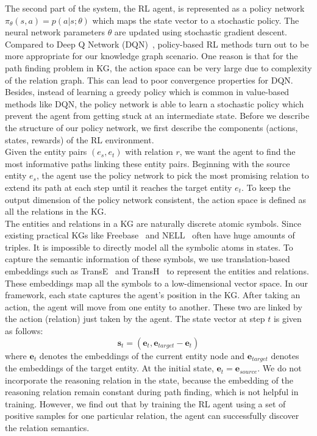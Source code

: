 \documentclass[11pt,letterpaper]{article}
\begin{document}
The second part of the system, the RL agent, is represented as a policy network $\pi_\theta(s,a)=p(a|s;\theta)$ which maps the state vector to a stochastic policy. The neural network parameters $\theta$ are updated using stochastic gradient descent. Compared to Deep Q Network (DQN)~\cite{Mnih}, policy-based RL methods turn out to be more appropriate for our knowledge graph scenario. One reason is that for the path finding problem in KG, the action space can be very large due to complexity of the relation graph. This can lead to poor convergence properties for DQN. Besides, instead of learning a greedy policy which is common in value-based methods like DQN, the policy network is able to learn a stochastic policy which prevent the agent from getting stuck at an intermediate state. Before we describe the structure of our policy network, we first describe the components (actions, states, rewards) of the RL environment.
\\

 Given the entity pairs $(e_s,e_t)$ with relation $r$, we want the agent to find the most informative paths linking these entity pairs. Beginning with the source entity $e_s$, the agent use the policy network to pick the most promising relation to extend its path at each step until it reaches the target entity $e_t$. To keep the output dimension of the policy network consistent, the action space is defined as all the relations in the KG.
\\

 The entities and relations in a KG are naturally discrete atomic symbols. Since existing practical KGs like Freebase~\cite{bollacker2008freebase} and NELL~\cite{carlson-aaai} often have huge amounts of triples. It is impossible to directly model all the symbolic atoms in states. To capture the semantic information of these symbols, we use translation-based embeddings such as TransE~\cite{bordes2013translating} and TransH~\cite{wang2014knowledge} to represent the entities and relations. These embeddings map all the symbols to a low-dimensional vector space. In our framework, each state captures the agent's position in the KG. After taking an action, the agent will move from one entity to another. These two are linked by the action (relation) just taken by the agent. The state vector at step $t$ is given as follows:
\begin{equation*}
\mathbf{s}_t = (\mathbf{e}_t, \mathbf{e}_{target} - \mathbf{e}_t)
\label{eq1}
\end{equation*}
where $\mathbf{e}_t$ denotes the embeddings of the current entity node and $\mathbf{e}_{target}$ denotes the embeddings of the target entity. At the initial state, $\mathbf{e}_t = \mathbf{e}_{source}$. We do not incorporate the reasoning relation in the state, because the embedding of the reasoning relation remain constant during path finding, which is not helpful in training. However, we find out that by training the RL agent using a set of positive samples for one particular relation, the agent can successfully discover the relation semantics.
\\
\end{document}
